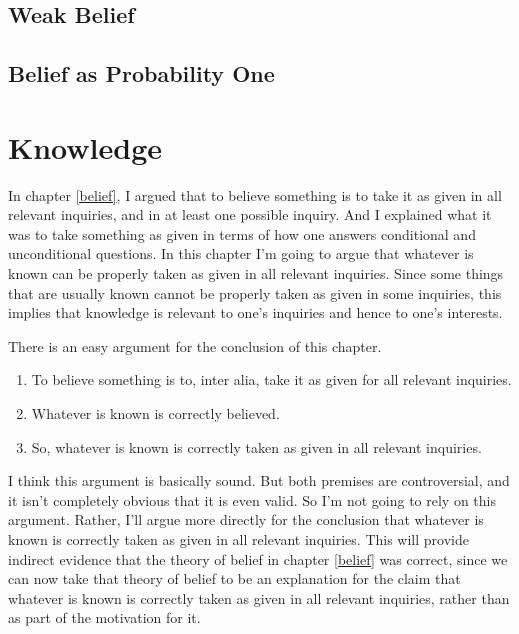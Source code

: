 \documentclass[11pt,]{book}
\providecommand{\tightlist}{%
  \setlength{\itemsep}{0pt}\setlength{\parskip}{0pt}}
\begin{document}
\hypertarget{weakbelief}{%
\section{Weak Belief}\label{weakbelief}}

\hypertarget{probone}{%
\section{Belief as Probability One}\label{probone}}

\hypertarget{knowledge}{%
\chapter{Knowledge}\label{knowledge}}

In chapter \ref{belief}, I argued that to believe something is to take it as given in all relevant inquiries, and in at least one possible inquiry. And I explained what it was to take something as given in terms of how one answers conditional and unconditional questions. In this chapter I'm going to argue that whatever is known can be properly taken as given in all relevant inquiries. Since some things that are usually known cannot be properly taken as given in some inquiries, this implies that knowledge is relevant to one's inquiries and hence to one's interests.

There is an easy argument for the conclusion of this chapter.

\begin{enumerate}
\def\labelenumi{\arabic{enumi}.}
\tightlist
\item
  To believe something is to, inter alia, take it as given for all relevant inquiries.
\item
  Whatever is known is correctly believed.
\item
  So, whatever is known is correctly taken as given in all relevant inquiries.
\end{enumerate}

I think this argument is basically sound. But both premises are controversial, and it isn't completely obvious that it is even valid. So I'm not going to rely on this argument. Rather, I'll argue more directly for the conclusion that whatever is known is correctly taken as given in all relevant inquiries. This will provide indirect evidence that the theory of belief in chapter \ref{belief} was correct, since we can now take that theory of belief to be an explanation for the claim that whatever is known is correctly taken as given in all relevant inquiries, rather than as part of the motivation for it.
\end{document}
